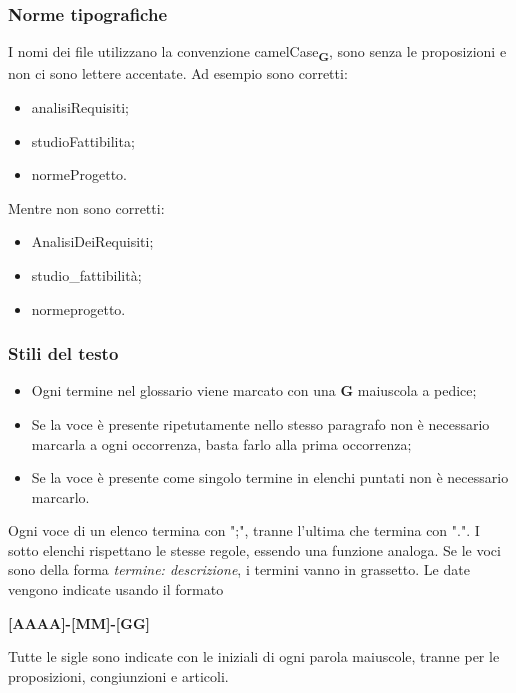 \subsubsection{Norme tipografiche}
I nomi dei file utilizzano la convenzione camelCase\textsubscript{\textbf{G}}, sono senza le proposizioni e non ci sono lettere accentate.
Ad esempio sono corretti:
\begin{itemize}
    \item analisiRequisiti;
    \item studioFattibilita;
    \item normeProgetto.
\end{itemize}
Mentre non sono corretti:
\begin{itemize}
    \item AnalisiDeiRequisiti;
    \item studio\_fattibilità;
    \item normeprogetto.
\end{itemize}
\subsubsection{Stili del testo}

\begin{itemize}
    \item Ogni termine nel glossario viene marcato con una \textbf{G} maiuscola a pedice;
    \item Se la voce è presente ripetutamente nello stesso paragrafo non è necessario marcarla a ogni occorrenza, basta farlo alla prima occorrenza;
    \item Se la voce è presente come singolo termine in elenchi puntati non è necessario marcarlo.
\end{itemize}

Ogni voce di un elenco termina con ";", tranne l'ultima che termina con ".". I sotto elenchi rispettano le stesse regole, essendo una funzione analoga. Se le voci sono della forma \textit{termine: descrizione}, i termini vanno in grassetto.
Le date vengono indicate usando il formato
\begin{center}
    \textbf{[AAAA]-[MM]-[GG]}
\end{center}
Tutte le sigle sono indicate con le iniziali di ogni parola maiuscole, tranne per le proposizioni, congiunzioni e articoli.
